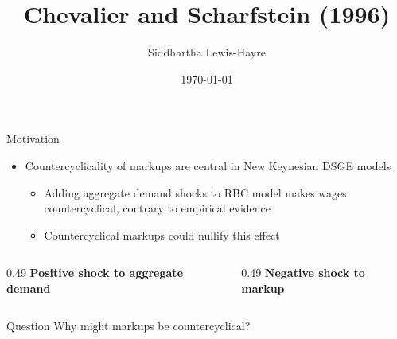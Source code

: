 \documentclass[aspectratio=169]{beamer}
\title{Chevalier and Scharfstein (1996)}
\author{Siddhartha Lewis-Hayre}
\date{\today}
\begin{document}
\begin{frame}
    \titlepage
\end{frame}

\begin{frame}{Motivation}
    \begin{itemize}
        \item Countercyclicality of markups are central in New Keynesian DSGE models
        \begin{itemize}
            \item Adding aggregate demand shocks to RBC model makes wages countercyclical, contrary to empirical evidence
            \item Countercyclical markups could nullify this effect
        \end{itemize}
    \end{itemize}

    \vspace{0.1cm}

    \begin{columns}[c,onlytextwidth]
        \begin{column}{0.49\textwidth}
            \centering
            \textbf{Positive shock to aggregate demand}

            \resizebox{0.88\linewidth}{!}{}
        \end{column}
        \begin{column}{0.49\textwidth}
            \centering
            \textbf{Negative shock to markup}

            \resizebox{0.88\linewidth}{!}{}
        \end{column}
    \end{columns}

    \begin{alertblock}{Question}
        Why might markups be countercyclical?
    \end{alertblock}
\end{frame}
\end{document}
